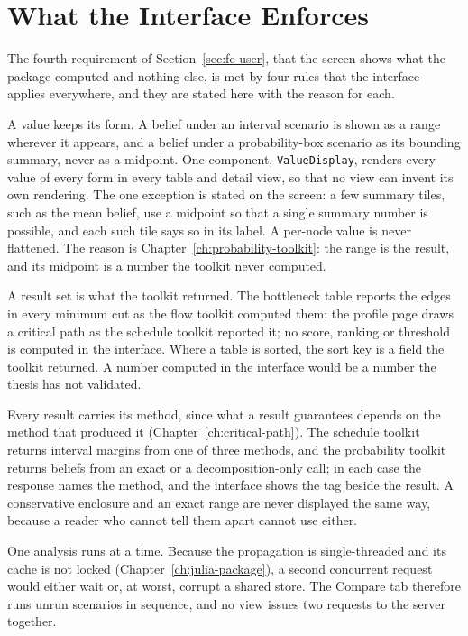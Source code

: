 \documentclass[12pt]{report}
\begin{document}
\FloatBarrier
\section{What the Interface Enforces}
\label{sec:fe-rules}

The fourth requirement of Section~\ref{sec:fe-user}, that the screen shows what the package
computed and nothing else, is met by four rules that the interface applies everywhere, and
they are stated here with the reason for each.

A value keeps its form. A belief under an interval scenario is shown as a range wherever it
appears, and a belief under a probability-box scenario as its bounding summary, never as a
midpoint. One component, \texttt{ValueDisplay}, renders every value of every form in every
table and detail view, so that no view can invent its own rendering. The one exception is
stated on the screen: a few summary tiles, such as the mean belief, use a midpoint so that a
single summary number is possible, and each such tile says so in its label. A per-node value
is never flattened. The reason is Chapter~\ref{ch:probability-toolkit}: the range is the
result, and its midpoint is a number the toolkit never computed.

A result set is what the toolkit returned. The bottleneck table reports the edges in every
minimum cut as the flow toolkit computed them; the profile page draws a critical path as
the schedule toolkit reported it; no score, ranking or threshold is computed in the
interface. Where a table is sorted, the sort key is a field the toolkit returned. A number
computed in the interface would be a number the thesis has not validated.

Every result carries its method, since what a result guarantees depends on the method that
produced it (Chapter~\ref{ch:critical-path}). The schedule toolkit returns interval margins
from one of three methods, and the probability toolkit returns beliefs from an exact or a
decomposition-only call; in each case the response names the method, and the interface
shows the tag beside the result. A conservative enclosure and an exact range are never
displayed the same way, because a reader who cannot tell them apart cannot use either.

One analysis runs at a time. Because the propagation is single-threaded and its cache is
not locked (Chapter~\ref{ch:julia-package}), a second concurrent request would either wait
or, at worst, corrupt a shared store. The Compare tab therefore runs unrun scenarios in
sequence, and no view issues two requests to the server together.
\end{document}
